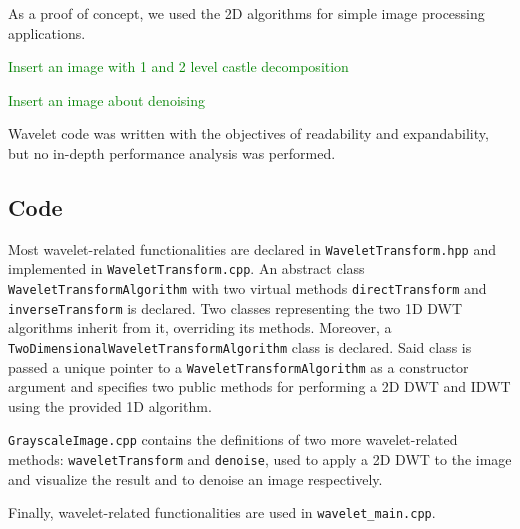 As a proof of concept, we used the 2D algorithms for simple image processing applications.

\textcolor{green}{Insert an image with 1 and 2 level castle decomposition}

\textcolor{green}{Insert an image about denoising}

Wavelet code was written with the objectives of readability and expandability, but no in-depth performance analysis was performed.

\subsection{Code}
Most wavelet-related functionalities are declared in \texttt{Wavelet\-Transform.hpp} and implemented in \texttt{Wavelet\-Transform.cpp}. An abstract class \texttt{Wavelet\-Transform\-Algorithm} with two virtual methods \texttt{direct\-Transform} and \texttt{inverse\-Transform} is declared. Two classes representing the two 1D DWT algorithms inherit from it, overriding its methods. Moreover, a \texttt{Two\-Dimensional\-Wavelet\-Transform\-Algorithm} class is declared. Said class is passed a unique pointer to a \texttt{Wavelet\-Transform\-Algorithm} as a constructor argument and specifies two public methods for performing a 2D DWT and IDWT using the provided 1D algorithm.

\texttt{Grayscale\-Image.cpp} contains the definitions of two more wavelet-related methods: \texttt{wavelet\-Transform} and \texttt{denoise}, used to apply a 2D DWT to the image and visualize the result and to denoise an image respectively.

Finally, wavelet-related functionalities are used in \texttt{wavelet\_main.cpp}.